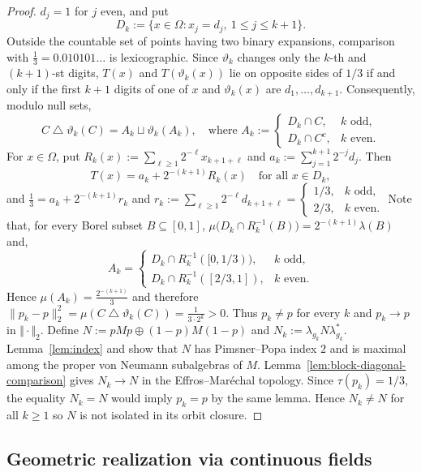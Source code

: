 \documentclass[12pt]{amsart} %
\theoremstyle{plain}
\theoremstyle{definition}
\begin{document}
\begin{proof}
$d_j=1$ for $j$ even, and put 
$$D_k:=\{x\in\Omega:x_j=d_j,\ 1\leq j\leq k+1\}.$$
Outside the countable set of points having two binary
expansions, comparison with $\frac13=0.010101\ldots$
is lexicographic. Since $\vartheta_k$ changes only the $k$-th and
$(k+1)$-st digits, $T(x)$ and $T(\vartheta_k(x))$ lie on opposite sides of
$1/3$ if and only if the first $k+1$ digits of one of $x$ and
$\vartheta_k(x)$ are $d_1,\ldots,d_{k+1}$. Consequently, modulo null sets,
$$
C\mathbin{\triangle}\vartheta_k(C)
=A_k\sqcup\vartheta_k(A_k),
\quad\text{where }A_k:=
\begin{cases}
D_k\cap C,&k\text{ odd},\\
D_k\cap C^c,&k\text{ even}.
\end{cases}
$$
\noindent For $x\in\Omega$, put
$R_k(x):=\sum_{\ell\geq1}2^{-\ell}x_{k+1+\ell}$ and 
$a_k:=\sum_{j=1}^{k+1}2^{-j}d_j$. Then
$$
T(x)=a_k+2^{-(k+1)}R_k(x)
\quad\text{for all }x\in D_k,
$$
and
$\frac13
=a_k+2^{-(k+1)}r_k$ and $r_k:=
\sum_{\ell\geq1}2^{-\ell}d_{k+1+\ell}
=
\begin{cases}
1/3,&k\text{ odd},\\
2/3,&k\text{ even}.
\end{cases}
$
\noindent Note that, for every Borel subset $B\subseteq[0,1]$, $\mu\bigl(D_k\cap R_k^{-1}(B)\bigr)=2^{-(k+1)}\lambda(B)$ and,
$$
A_k=
\begin{cases}
D_k\cap R_k^{-1}([0,1/3)),&k\text{ odd},\\
D_k\cap R_k^{-1}([2/3,1]),&k\text{ even}.
\end{cases}
$$
Hence $\mu(A_k)=\frac{2^{-(k+1)}}{3}$ and therefore  $\|p_k-p\|_2^2
=
\mu(C\mathbin{\triangle}\vartheta_k(C))
=
\frac{1}{3\cdot2^k}>0
$. Thus $p_k\neq p$ for every $k$ and $p_k\to p$ in $\Vert\cdot\Vert_2$.
\medskip
\noindent Define $
N:=pMp\oplus(1-p)M(1-p)$ and $N_k:=\lambda_{g_k}N\lambda_{g_k}^*$. Lemma~\ref{lem:index} and
\cite[Proposition~3.4]{zhou_maximal_typeI} show that $N$ has
Pimsner--Popa index $2$ and is maximal among the proper von Neumann
subalgebras of $M$. Lemma~\ref{lem:block-diagonal-comparison} gives $N_k\to N$ in the Effros--Mar\'echal topology. Since $\tau(p_k)=1/3$, the equality
$N_k=N$ would imply $p_k=p$ by the same lemma. Hence $N_k\neq N$ for all $k\geq1$ so $N$ is not isolated in its orbit closure.\end{proof}
\subsection{Geometric realization via continuous fields}
\label{subsec:continuousfields}
\end{document}
